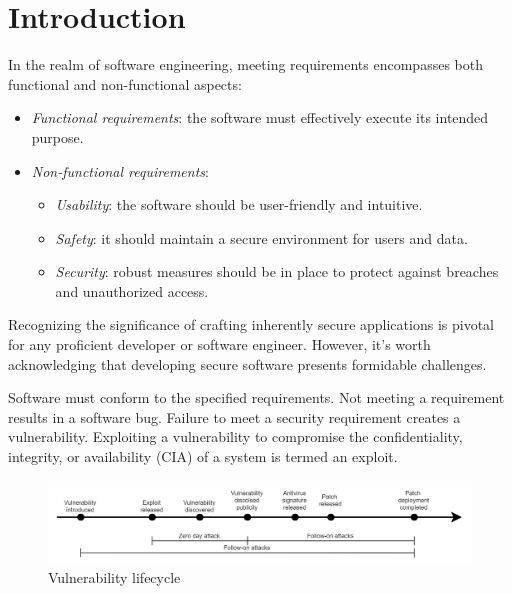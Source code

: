 \section{Introduction}

In the realm of software engineering, meeting requirements encompasses both functional and non-functional aspects:
\begin{itemize}
    \item \textit{Functional requirements}: the software must effectively execute its intended purpose.
    \item \textit{Non-functional requirements}: 
        \begin{itemize}
            \item \textit{Usability}: the software should be user-friendly and intuitive.
            \item \textit{Safety}: it should maintain a secure environment for users and data.
            \item \textit{Security}: robust measures should be in place to protect against breaches and unauthorized access.
        \end{itemize}
\end{itemize}
Recognizing the significance of crafting inherently secure applications is pivotal for any proficient developer or software engineer. 
However, it's worth acknowledging that developing secure software presents formidable challenges.

Software must conform to the specified requirements. 
Not meeting a requirement results in a software bug. 
Failure to meet a security requirement creates a vulnerability. 
Exploiting a vulnerability to compromise the confidentiality, integrity, or availability (CIA) of a system is termed an exploit.

\begin{figure}[H]
    \centering
    \includegraphics[width=1.0\linewidth]{images/vulnerability.png}
    \caption{Vulnerability lifecycle}
\end{figure}

